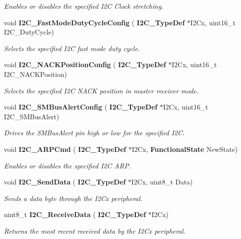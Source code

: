\begin{DoxyCompactItemize}
\begin{DoxyCompactList}\small\item\em Enables or disables the specified I2C Clock stretching. \end{DoxyCompactList}\item 
void \textbf{ I2\+C\+\_\+\+Fast\+Mode\+Duty\+Cycle\+Config} (\textbf{ I2\+C\+\_\+\+Type\+Def} $\ast$I2\+Cx, uint16\+\_\+t I2\+C\+\_\+\+Duty\+Cycle)
\begin{DoxyCompactList}\small\item\em Selects the specified I2C fast mode duty cycle. \end{DoxyCompactList}\item 
void \textbf{ I2\+C\+\_\+\+N\+A\+C\+K\+Position\+Config} (\textbf{ I2\+C\+\_\+\+Type\+Def} $\ast$I2\+Cx, uint16\+\_\+t I2\+C\+\_\+\+N\+A\+C\+K\+Position)
\begin{DoxyCompactList}\small\item\em Selects the specified I2C N\+A\+CK position in master receiver mode. \end{DoxyCompactList}\item 
void \textbf{ I2\+C\+\_\+\+S\+M\+Bus\+Alert\+Config} (\textbf{ I2\+C\+\_\+\+Type\+Def} $\ast$I2\+Cx, uint16\+\_\+t I2\+C\+\_\+\+S\+M\+Bus\+Alert)
\begin{DoxyCompactList}\small\item\em Drives the S\+M\+Bus\+Alert pin high or low for the specified I2C. \end{DoxyCompactList}\item 
void \textbf{ I2\+C\+\_\+\+A\+R\+P\+Cmd} (\textbf{ I2\+C\+\_\+\+Type\+Def} $\ast$I2\+Cx, \textbf{ Functional\+State} New\+State)
\begin{DoxyCompactList}\small\item\em Enables or disables the specified I2C A\+RP. \end{DoxyCompactList}\item 
void \textbf{ I2\+C\+\_\+\+Send\+Data} (\textbf{ I2\+C\+\_\+\+Type\+Def} $\ast$I2\+Cx, uint8\+\_\+t Data)
\begin{DoxyCompactList}\small\item\em Sends a data byte through the I2\+Cx peripheral. \end{DoxyCompactList}\item 
uint8\+\_\+t \textbf{ I2\+C\+\_\+\+Receive\+Data} (\textbf{ I2\+C\+\_\+\+Type\+Def} $\ast$I2\+Cx)
\begin{DoxyCompactList}\small\item\em Returns the most recent received data by the I2\+Cx peripheral. \end{DoxyCompactList}\item 

\end{DoxyCompactItemize}
